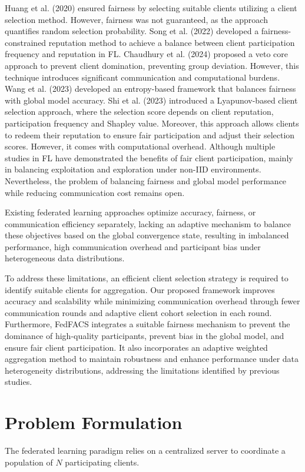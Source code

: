 \documentclass[pdflatex,sn-mathphys-num,oneside]{sn-jnl}%
\theoremstyle{thmstyleone}%
\theoremstyle{thmstyletwo}%
\theoremstyle{thmstylethree}%
\begin{document}
Huang et al. (2020) ensured fairness by selecting suitable clients utilizing a client selection method. However, fairness was not guaranteed, as the approach quantifies random selection probability. Song et al. (2022) developed a fairness-constrained reputation method to achieve a balance between client participation frequency and reputation in FL. Chaudhury et al. (2024) proposed a veto core approach to prevent client domination, preventing group deviation. However, this technique introduces significant communication and computational burdens. Wang et al. (2023) developed an entropy-based framework that balances fairness with global model accuracy. Shi et al. (2023) introduced a Lyapunov-based client selection approach, where the selection score depends on client reputation, participation frequency and Shapley value. Moreover, this approach allows clients to redeem their reputation to ensure fair participation and adjust their selection scores. However, it comes with computational overhead. Although multiple studies in FL have demonstrated the benefits of fair client participation, mainly in balancing exploitation and exploration under non-IID environments. Nevertheless, the problem of balancing fairness and global model performance while reducing communication cost remains open.

Existing federated learning approaches optimize accuracy, fairness, or communication efficiency separately, lacking an adaptive mechanism to balance these objectives based on the global convergence state, resulting in imbalanced performance, high communication overhead and participant bias under heterogeneous data distributions.

To address these limitations, an efficient client selection strategy is required to identify suitable clients for aggregation. Our proposed framework improves accuracy and scalability while minimizing communication overhead through fewer communication rounds and adaptive client cohort selection in each round. Furthermore, FedFACS integrates a suitable fairness mechanism to prevent the dominance of high-quality participants, prevent bias in the global model, and ensure fair client participation. It also incorporates an adaptive weighted aggregation method to maintain robustness and enhance performance under data heterogeneity distributions, addressing the limitations identified by previous studies.

\section{Problem Formulation }\label{sec3}
The federated learning paradigm relies on a centralized server to coordinate a population of $N$ participating clients.
\end{document}
